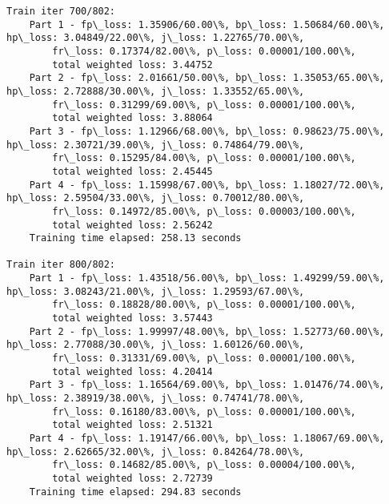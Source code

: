 \documentclass[11pt]{article}
\begin{document}
\begin{Verbatim}[commandchars=\\\{\}]
Train iter 700/802:
	Part 1 - fp\_loss: 1.35906/60.00\%, bp\_loss: 1.50684/60.00\%, hp\_loss: 3.04849/22.00\%, j\_loss: 1.22765/70.00\%, 
		fr\_loss: 0.17374/82.00\%, p\_loss: 0.00001/100.00\%, 
		total weighted loss: 3.44752
	Part 2 - fp\_loss: 2.01661/50.00\%, bp\_loss: 1.35053/65.00\%, hp\_loss: 2.72888/30.00\%, j\_loss: 1.33552/65.00\%, 
		fr\_loss: 0.31299/69.00\%, p\_loss: 0.00001/100.00\%, 
		total weighted loss: 3.88064
	Part 3 - fp\_loss: 1.12966/68.00\%, bp\_loss: 0.98623/75.00\%, hp\_loss: 2.30721/39.00\%, j\_loss: 0.74864/79.00\%, 
		fr\_loss: 0.15295/84.00\%, p\_loss: 0.00001/100.00\%, 
		total weighted loss: 2.45445
	Part 4 - fp\_loss: 1.15998/67.00\%, bp\_loss: 1.18027/72.00\%, hp\_loss: 2.59504/33.00\%, j\_loss: 0.70012/80.00\%, 
		fr\_loss: 0.14972/85.00\%, p\_loss: 0.00003/100.00\%, 
		total weighted loss: 2.56242
	Training time elapsed: 258.13 seconds

Train iter 800/802:
	Part 1 - fp\_loss: 1.43518/56.00\%, bp\_loss: 1.49299/59.00\%, hp\_loss: 3.08243/21.00\%, j\_loss: 1.29593/67.00\%, 
		fr\_loss: 0.18828/80.00\%, p\_loss: 0.00001/100.00\%, 
		total weighted loss: 3.57443
	Part 2 - fp\_loss: 1.99997/48.00\%, bp\_loss: 1.52773/60.00\%, hp\_loss: 2.77088/30.00\%, j\_loss: 1.60126/60.00\%, 
		fr\_loss: 0.31331/69.00\%, p\_loss: 0.00001/100.00\%, 
		total weighted loss: 4.20414
	Part 3 - fp\_loss: 1.16564/69.00\%, bp\_loss: 1.01476/74.00\%, hp\_loss: 2.38919/38.00\%, j\_loss: 0.74741/78.00\%, 
		fr\_loss: 0.16180/83.00\%, p\_loss: 0.00001/100.00\%, 
		total weighted loss: 2.51321
	Part 4 - fp\_loss: 1.19147/66.00\%, bp\_loss: 1.18067/69.00\%, hp\_loss: 2.62665/32.00\%, j\_loss: 0.84264/78.00\%, 
		fr\_loss: 0.14682/85.00\%, p\_loss: 0.00004/100.00\%, 
		total weighted loss: 2.72739
	Training time elapsed: 294.83 seconds


\end{Verbatim}
\end{document}
